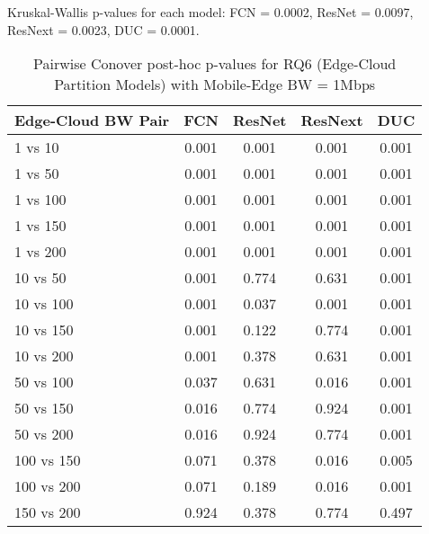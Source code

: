 \begin{table}[h]
\centering
\caption{Pairwise Conover post-hoc p-values for RQ6 (Edge-Cloud Partition Models) with Mobile-Edge BW = 1Mbps}
\label{tab:conover_edge_cloud_partition_me1}
\smallskip
Kruskal-Wallis p-values for each model: FCN = 0.0002, ResNet = 0.0097, ResNext = 0.0023, DUC = 0.0001.

\begin{tabular}{lcccc}
\toprule
Edge-Cloud BW Pair & FCN & ResNet & ResNext & DUC \\
\midrule
1 vs 10 & 0.001 & 0.001 & 0.001 & 0.001 \\
1 vs 50 & 0.001 & 0.001 & 0.001 & 0.001 \\
1 vs 100 & 0.001 & 0.001 & 0.001 & 0.001 \\
1 vs 150 & 0.001 & 0.001 & 0.001 & 0.001 \\
1 vs 200 & 0.001 & 0.001 & 0.001 & 0.001 \\
10 vs 50 & 0.001 & 0.774 & 0.631 & 0.001 \\
10 vs 100 & 0.001 & 0.037 & 0.001 & 0.001 \\
10 vs 150 & 0.001 & 0.122 & 0.774 & 0.001 \\
10 vs 200 & 0.001 & 0.378 & 0.631 & 0.001 \\
50 vs 100 & 0.037 & 0.631 & 0.016 & 0.001 \\
50 vs 150 & 0.016 & 0.774 & 0.924 & 0.001 \\
50 vs 200 & 0.016 & 0.924 & 0.774 & 0.001 \\
100 vs 150 & 0.071 & 0.378 & 0.016 & 0.005 \\
100 vs 200 & 0.071 & 0.189 & 0.016 & 0.001 \\
150 vs 200 & 0.924 & 0.378 & 0.774 & 0.497 \\
\bottomrule
\end{tabular}
\end{table}

